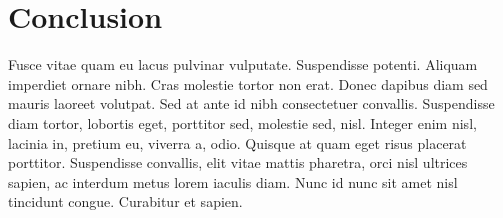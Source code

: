 \chapter{Conclusion}
Fusce vitae quam eu lacus pulvinar vulputate. Suspendisse potenti. Aliquam imperdiet ornare nibh. Cras molestie tortor non erat. Donec dapibus diam sed mauris laoreet volutpat. Sed at ante id nibh consectetuer convallis. Suspendisse diam tortor, lobortis eget, porttitor sed, molestie sed, nisl. Integer enim nisl, lacinia in, pretium eu, viverra a, odio. Quisque at quam eget risus placerat porttitor. Suspendisse convallis, elit vitae mattis pharetra, orci nisl ultrices sapien, ac interdum metus lorem iaculis diam. Nunc id nunc sit amet nisl tincidunt congue. Curabitur et sapien.